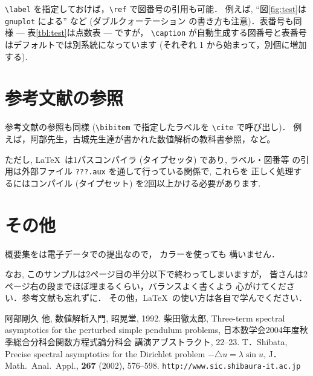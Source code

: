 \documentclass[twocolumn]{jarticle}
\begin{document}
\verb!\label! を指定しておけば，\verb!\ref! で図番号の引用も可能．
例えば,
``図\ref{fig:test}は {\tt gnuplot} による'' など (ダブルクォーテーション
の書き方も注意)．表番号も同様 --- 表\ref{tbl:test}は点数表 --- ですが，
\verb!\caption! が自動生成する図番号と表番号はデフォルトでは別系統になっています (それぞれ 1 から始まって，別個に増加する).

\section{参考文献の参照}
参考文献の参照も同様 (\verb!\bibitem! で指定したラベルを \verb!\cite! で呼び出し)．
例えば，阿部先生，古城先生達が書かれた数値解析の教科書\cite{Abe92}参照，など。

  ただし, \LaTeX\ は1パスコンパイラ (タイプセッタ) であり, ラベル・図番等
の引用は外部ファイル {\tt ???.aux} を通して行っている関係で, これらを
正しく処理するにはコンパイル (タイプセット) を2回以上かける必要があります.



\section{その他}
概要集をは電子データでの提出なので，
\color{blue}カ\color{green}ラ\color{red}ー\color{cyan}を使っても
\color{magenta}構いません\color{black}．
\par
なお, このサンプルは2ページ目の半分以下で終わってしまいますが，
皆さんは2ページ右の段までほぼ埋まるくらい，バランスよく書くよう
心がけてください．参考文献も忘れずに．
その他，\LaTeX\ の使い方は各自で学んでください．
\par

\begin{thebibliography}{1}
  阿部剛久 他, 数値解析入門, 昭晃堂, 1992.
  柴田徹太郎, Three-term spectral asymptotics for the perturbed simple
  pendulum problems, 日本数学会2004年度秋季総合分科会関数方程式論分科会
  講演アブストラクト, 22--23.
  T．Shibata, Precise spectral asymptotics for the Dirichlet problem
  $-\triangle u=\lambda\sin u$, J．Math.\ Anal.\ Appl., {\bf 267}
  (2002), 576--598.
 {\tt http://www.sic.shibaura-it.ac.jp}
\end{thebibliography}
\end{document}
